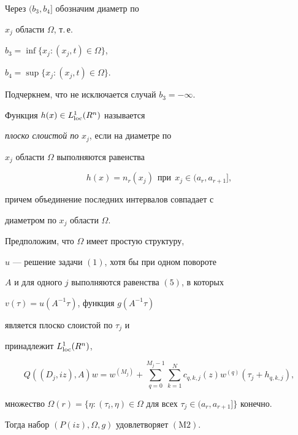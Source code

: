 Через $ (b_{3}, b_{4}]$ обозначим диаметр по


$x_{j}$ области $\Omega$, т.\,е. 


$b_{3}= \inf \{ x_{j} : (x_{j}, t) \in \Omega \}$, 


$b_{4}= \sup \{ x_{j} : (x_{j}, t) \in \Omega \} $. 


Подчеркнем, что не исключается случай $b_{3}= -\infty$.





\begin{defn}


Функция $h(x) \in L^{1}_{\operatorname{loc}}(R^{n})$ называется


{\it плоско слоистой по} $x_{j} $, если на диаметре по


$x_{j}$ области $\Omega$ выполняются равенства


$$


h(x)= n_{r}(x_{j}) \ \ \text{при} \ \ x_{j} \in (a_{r}, a_{r+1}],


$$


причем объединение последних интервалов совпадает с


диаметром по $x_{j}$ области $\Omega$. 


\end{defn}





\begin{thm}


Предположим, что $\Omega$ имеет простую структуру,


$u$ --- решение задачи $(1)$, хотя бы при одном повороте


$A$ и для одного $j$ выполняются равенства $(5)$, в которых


$v(\tau)=u(A^{-1}\tau)$, функция $g(A^{-1}\tau)$


является плоско слоистой по $\tau_{j}$ и


принадлежит $L^{1}_{\operatorname{loc}}(R^{n})$,


\begin{equation}


Q((D_{j}, iz), A)w= w^{(M_{j})} + \sum_{q=0}^{M_{j}-1}


\sum_{k=1}^{N} c_{q, k, j}(z) w^{(q)}(\tau_{j}+h_{q, k, j}), 


\end{equation}


множество $\Omega (r)= \{ \eta : (\tau_{i}, \eta) \in


\Omega$ для всех $\tau_{j} \in (a_{r}, a_{r+1}] \}$ конечно. 





Тогда набор $ (P(iz), \Omega, g)$ удовлетворяет $(\mathrm M2)$. 


\end{thm}






